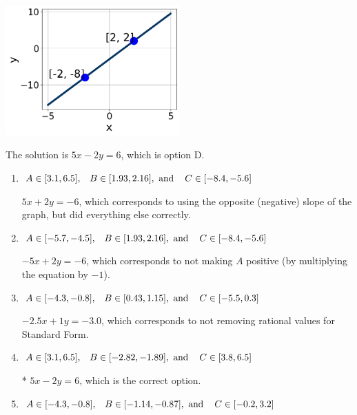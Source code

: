 \documentclass{extbook}[14pt]
\begin{document}
\begin{enumerate}
{\begin{center}
    \includegraphics[width=0.5\textwidth]{../Figures/linearGraphToStandardCopyA.png}
\end{center}




The solution is \( 5x - 2y = 6 \), which is option D.\begin{enumerate}[label=\Alph*.]
\item \( A \in [3.1, 6.5], \hspace{3mm} B \in [1.93, 2.16], \text{ and } \hspace{3mm} C \in [-8.4, -5.6] \)

 $5x + 2y = -6$, which corresponds to using the opposite (negative) slope of the graph, but did everything else correctly.
\item \( A \in [-5.7, -4.5], \hspace{3mm} B \in [1.93, 2.16], \text{ and } \hspace{3mm} C \in [-8.4, -5.6] \)

 $-5x + 2y = -6$, which corresponds to not making $A$ positive (by multiplying the equation by $-1$).
\item \( A \in [-4.3, -0.8], \hspace{3mm} B \in [0.43, 1.15], \text{ and } \hspace{3mm} C \in [-5.5, 0.3] \)

 $-2.5x + 1y = -3.0$, which corresponds to not removing rational values for Standard Form.
\item \( A \in [3.1, 6.5], \hspace{3mm} B \in [-2.82, -1.89], \text{ and } \hspace{3mm} C \in [3.8, 6.5] \)

* $5x - 2y = 6$, which is the correct option.
\item \( A \in [-4.3, -0.8], \hspace{3mm} B \in [-1.14, -0.87], \text{ and } \hspace{3mm} C \in [-0.2, 3.2] \)


\end{enumerate}}
\end{enumerate}
\end{document}
